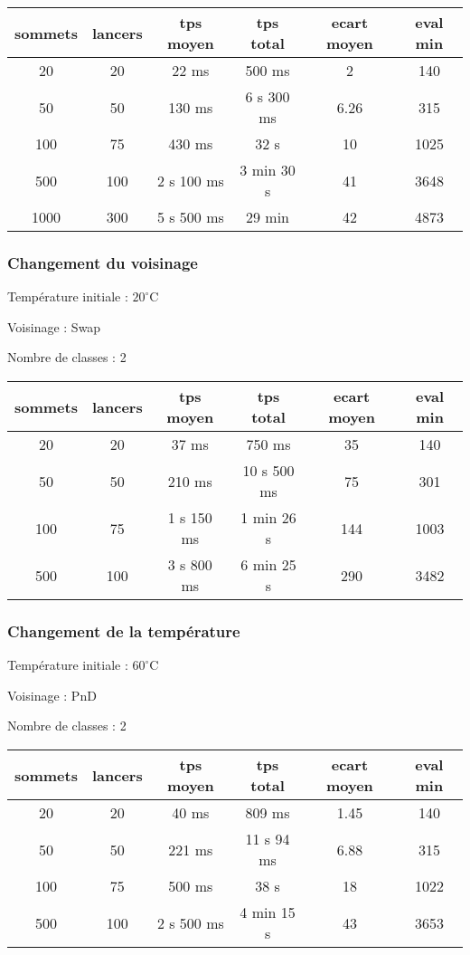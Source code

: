 \documentclass[12pt]{article}
\begin{document}
\begin{tabular}{|c|c|c|c|c|c|}
	\hline 
	sommets & lancers & tps moyen & tps total & ecart moyen & eval min\\
	\hline
20 & 20 & 22 ms & 500 ms & 2 & 140 \\ 
	\hline
	 50  &  50  &   130  ms   &   6 s  300  ms   &   6.26  &   315  \\
	\hline
100  &  75  &   430  ms   &  32 s  &  10   &   1025  \\ 
	\hline
500  &  100  & 2 s 100 ms  &  3 min 30  s &  41  &   3648  \\
	\hline
	1000  &  300  &  5 s 500 ms &  29 min &  42   &   4873  \\ 
	\hline
\end{tabular}
\bigskip

\subsubsection*{Changement du voisinage}

Température initiale : $20^\circ$C

Voisinage : Swap

Nombre de classes : 2
\bigskip

\begin{tabular}{|c|c|c|c|c|c|}
	\hline 
	sommets & lancers & tps moyen & tps total & ecart moyen & eval min\\
	\hline
	20 & 20 & 37 ms & 750 ms & 35 & 140 \\
	\hline
	 50  &  50  &   210  ms   &   10 s  500  ms   &  75   &   301  \\
	\hline
	 100  &  75  & 1 s 150  ms   &  1 min 26 s &  144   &   1003  \\
	\hline
	 500  &  100  & 3 s 800  ms  &  6 min 25  s &   290  &   3482  \\
	\hline
\end{tabular}
\bigskip

\subsubsection*{Changement de la température}

Température initiale : $60^\circ$C

Voisinage : PnD

Nombre de classes : 2

\bigskip
\begin{tabular}{|c|c|c|c|c|c|}
	\hline 
	sommets & lancers & tps moyen & tps total & ecart moyen & eval min\\
	\hline
20 & 20 & 40 ms & 809 ms & 1.45 & 140 \\ 
	\hline
50  &  50  & 221 ms   &  11 s 94 ms  &   6.88  & 315\\ 
	\hline
100  &  75  &   500  ms   &  38 s &   18  &  1022   \\ 
	\hline
500  &  100  &   2 s 500   ms  & 4 min 15 s & 43  & 3653  \\
	\hline
\end{tabular}
\bigskip
\end{document}
